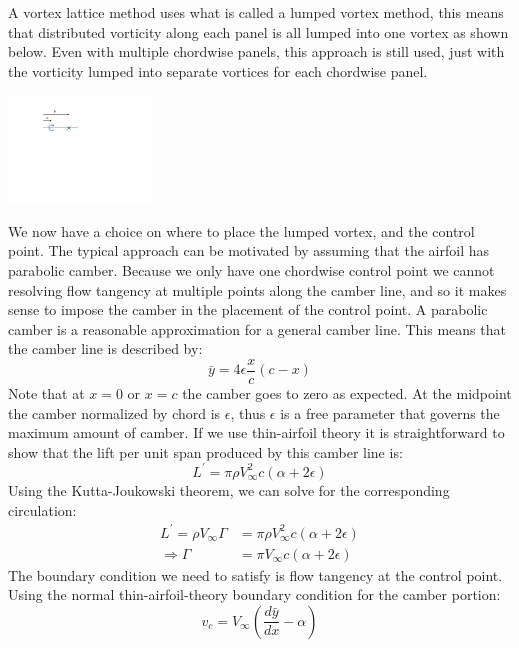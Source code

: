 \documentclass{article}
\begin{document}
A vortex lattice method uses what is called a lumped vortex method, this means that distributed vorticity along each panel is all lumped into one vortex as shown below.  Even with multiple chordwise panels, this approach is still used, just with the vorticity lumped into separate vortices for each chordwise panel.
\begin{center}
\includegraphics[width=1.5in]{figs/lumped-vortex}
\end{center}
We now have a choice on where to place the lumped vortex, and the control point.  The typical approach can be motivated by assuming that the airfoil has parabolic camber.  Because we only have one chordwise control point we cannot resolving flow tangency at multiple points along the camber line, and so it makes sense to impose the camber in the placement of the control point.  A parabolic camber is a reasonable approximation for a general camber line.  This means that the camber line is described by:
\begin{equation}
\bar{y} = 4 \epsilon \frac{x}{c} (c - x)
\end{equation}
Note that at $x = 0$ or $x = c$ the camber goes to zero as expected.  At the midpoint the camber normalized by chord is $\epsilon$, thus $\epsilon$ is a free parameter that governs the maximum amount of camber.  If we use thin-airfoil theory it is straightforward to show that the lift per unit span produced by this camber line is:
\begin{equation}
L^\prime = \pi \rho V_\infty^2 c (\alpha + 2 \epsilon)
\end{equation}
Using the Kutta-Joukowski theorem, we can solve for the corresponding circulation:
\begin{align}
L^\prime = \rho V_\infty \Gamma &= \pi \rho V_\infty^2 c (\alpha + 2 \epsilon)\\
\Rightarrow \Gamma &= \pi V_\infty c (\alpha + 2 \epsilon)
\end{align}
The boundary condition we need to satisfy is flow tangency at the control point.  Using the normal thin-airfoil-theory boundary condition for the camber portion:
\begin{equation}
v_c = V_\infty \left(\frac{d\bar{y}}{dx} - \alpha \right)
\end{equation}
\end{document}
